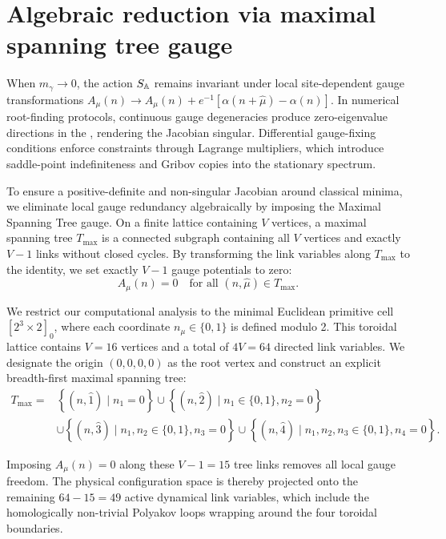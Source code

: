 \documentclass[11pt,a4paper]{article}
\begin{document}
\section{Algebraic reduction via maximal spanning tree gauge}

When $m_\gamma \to 0$, the action $S_{\mathbb{A}}$ remains invariant under local site-dependent gauge transformations $A_\mu(n) \to A_\mu(n) + e^{-1}[\alpha(n+\hat{\mu}) - \alpha(n)]$. In numerical root-finding protocols, continuous gauge degeneracies produce zero-eigenvalue directions in the {\jacobianOrb}, rendering the Jacobian singular. Differential gauge-fixing conditions enforce constraints through Lagrange multipliers, which introduce saddle-point indefiniteness and Gribov copies into the stationary spectrum.

To ensure a positive-definite and non-singular Jacobian around classical minima, we eliminate local gauge redundancy algebraically by imposing the Maximal Spanning Tree gauge. On a finite lattice containing $V$ vertices, a maximal spanning tree $T_{\text{max}}$ is a connected subgraph containing all $V$ vertices and exactly $V-1$ links without closed cycles. By transforming the link variables along $T_{\text{max}}$ to the identity, we set exactly $V-1$ gauge potentials to zero:
\begin{equation}
A_\mu(n) = 0 \quad \text{for all } (n, \hat{\mu}) \in T_{\text{max}}.
\end{equation}

We restrict our computational analysis to the minimal Euclidean primitive cell $[2^3 \times 2]_0$, where each coordinate $n_\mu \in \{0, 1\}$ is defined modulo 2. This toroidal lattice contains $V = 16$ vertices and a total of $4V = 64$ directed link variables. We designate the origin $(0,0,0,0)$ as the root vertex and construct an explicit breadth-first maximal spanning tree:
\begin{equation}
\begin{split}
T_{\text{max}} = {}& \left\{ (n, \hat{1}) \mid n_1 = 0 \right\} \cup \left\{ (n, \hat{2}) \mid n_1 \in \{0,1\}, n_2 = 0 \right\} \\
& \cup \left\{ (n, \hat{3}) \mid n_1,n_2 \in \{0,1\}, n_3 = 0 \right\} \cup \left\{ (n, \hat{4}) \mid n_1,n_2,n_3 \in \{0,1\}, n_4 = 0 \right\}.
\end{split}
\end{equation}

Imposing $A_\mu(n) = 0$ along these $V-1 = 15$ tree links removes all local gauge freedom. The physical configuration space is thereby projected onto the remaining $64 - 15 = 49$ active dynamical link variables, which include the homologically non-trivial Polyakov loops wrapping around the four toroidal boundaries.
\end{document}
